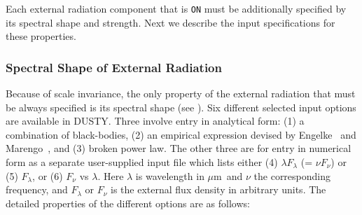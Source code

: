 \documentclass[11pt]{article}
\def\D    {{\sf DUSTY}}
\def\mic    {\hbox{$\mu$m}}
\begin{document}
Each external radiation component that is {\tt ON} must be
additionally specified by its spectral shape and strength. Next we
describe the input specifications for these properties.

\subsubsection{Spectral Shape of External Radiation}
\label{sec:type_raiation}
%
Because of scale invariance, the only property of the external
radiation that must be always specified is its spectral shape (see
\cite{IE97}). Six different selected input options are available in
\D. Three involve entry in analytical form: (1) a combination of
black-bodies, (2) an empirical expression devised by
Engelke~\cite{Engelk} and Marengo~\cite{Mareng}, and (3) broken power
law. The other three are for entry in numerical form as a separate
user-supplied input file which lists either (4) $\lambda F_\lambda$ (=
$\nu F_\nu$) or (5) $F_\lambda$, or (6) $F_\nu$ vs $\lambda$.  Here
$\lambda$ is wavelength in \mic\ and $\nu$ the corresponding
frequency, and $F_\lambda$ or $F_\nu$ is the external flux density in
arbitrary units. The detailed properties of the different options are
as follows:
\end{document}
